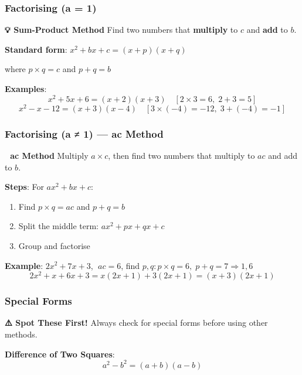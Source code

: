 \documentclass[
  letterpaper,
  DIV=11,
  numbers=noendperiod]{scrreprt}
\providecommand{\tightlist}{%
  \setlength{\itemsep}{0pt}\setlength{\parskip}{0pt}}
\theoremstyle{definition}
\theoremstyle{remark}
\begin{document}
\subsubsection*{Factorising (a = 1)}\label{factorising-a-1}

\textbf{💡 Sum-Product Method} Find two numbers that \textbf{multiply}
to \(c\) and \textbf{add} to \(b\).

\textbf{Standard form}: \(x^2 + bx + c = (x + p)(x + q)\)

where \(p \times q = c\) and \(p + q = b\)

\textbf{Examples}:
\[x^2 + 5x + 6 = (x+2)(x+3) \quad [2\times3=6,\;2+3=5]\]
\[x^2 - x - 12 = (x+3)(x-4) \quad [3\times(-4)=-12,\;3+(-4)=-1]\]

\subsubsection*{Factorising (a ≠ 1) --- ac
Method}\label{factorising-a-1-ac-method}

\textbf{🎯 ac Method} Multiply \(a \times c\), then find two numbers
that multiply to \(ac\) and add to \(b\).

\textbf{Steps}: For \(ax^2 + bx + c\):

\begin{enumerate}
\def\labelenumi{\arabic{enumi}.}
\tightlist
\item
  Find \(p \times q = ac\) and \(p + q = b\)
\item
  Split the middle term: \(ax^2 + px + qx + c\)
\item
  Group and factorise
\end{enumerate}

\textbf{Example}: \(2x^2 + 7x + 3\), \(\;ac = 6\), find
\(p,q: p\times q=6,\; p+q=7 \Rightarrow 1,6\)
\[2x^2 + x + 6x + 3 = x(2x+1) + 3(2x+1) = (x+3)(2x+1)\]

\subsubsection*{Special Forms}\label{special-forms}

\textbf{⚠️ Spot These First!} Always check for special forms before
using other methods.

\textbf{Difference of Two Squares}: \[a^2 - b^2 = (a+b)(a-b)\]
\end{document}
